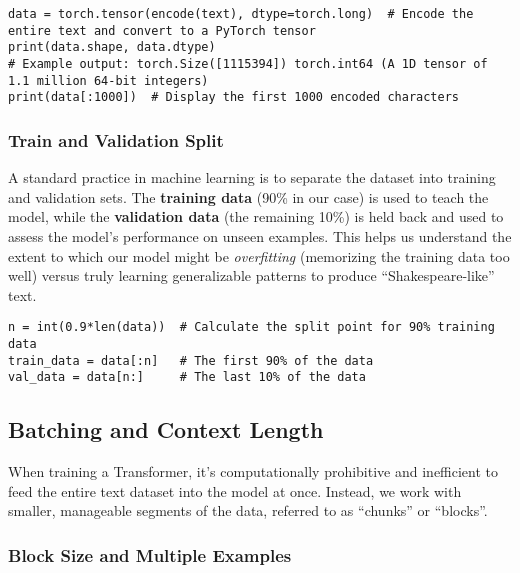 \begin{lstlisting}[caption={Encoding the full dataset into a PyTorch tensor}]
data = torch.tensor(encode(text), dtype=torch.long)  # Encode the entire text and convert to a PyTorch tensor
print(data.shape, data.dtype)
# Example output: torch.Size([1115394]) torch.int64 (A 1D tensor of 1.1 million 64-bit integers)
print(data[:1000])  # Display the first 1000 encoded characters
\end{lstlisting}

\subsubsection{Train and Validation Split}

A standard practice in machine learning is to separate the dataset into training and validation sets. The \textbf{training data} (90\% in our case) is used to teach the model, while the \textbf{validation data} (the remaining 10\%) is held back and used to assess the model's performance on unseen examples. This helps us understand the extent to which our model might be \textit{overfitting} (memorizing the training data too well) versus truly learning generalizable patterns to produce ``Shakespeare-like'' text.

\begin{lstlisting}[caption={Splitting data into train and validation sets}]
n = int(0.9*len(data))  # Calculate the split point for 90% training data
train_data = data[:n]   # The first 90% of the data
val_data = data[n:]     # The last 10% of the data
\end{lstlisting}

\subsection{Batching and Context Length}

When training a Transformer, it's computationally prohibitive and inefficient to feed the entire text dataset into the model at once. Instead, we work with smaller, manageable segments of the data, referred to as ``chunks'' or ``blocks''.

\subsubsection{Block Size and Multiple Examples}

